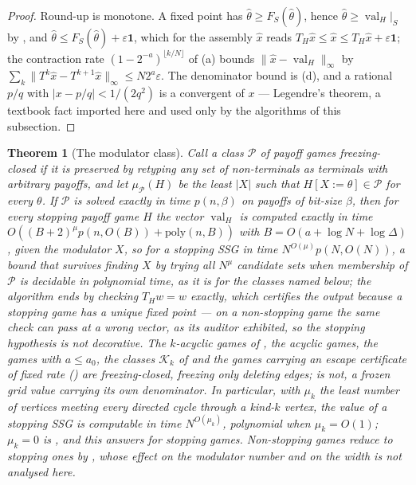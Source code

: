\documentclass[11pt]{article}
\theoremstyle{plain}
\newtheorem{theorem}{Theorem}[section]
\theoremstyle{definition}
\DeclareMathOperator{\val}{val}
\newcommand{\bbone}{\mathbf{1}}
\begin{document}
\begin{proof}
Round-up is monotone. A fixed point has $\hat\theta\ge F_S(\hat\theta)$,
hence $\hat\theta\ge\val_H|_S$ by , and
$\hat\theta\le F_S(\hat\theta)+\varepsilon\bbone$, which for the assembly
$\hat x$ reads $T_H\hat x\le\hat x\le T_H\hat x+\varepsilon\bbone$; the
contraction rate $(1-2^{-a})^{\lfloor k/N\rfloor}$ of
(a) bounds $\|\hat x-\val_H\|_\infty$ by
$\sum_k\|T^{k}\hat x-T^{k+1}\hat x\|_\infty\le N2^{a}\varepsilon$. The
denominator bound is (d), and a rational $p/q$
with $|x-p/q|<1/(2q^{2})$ is a convergent of $x$ --- Legendre's theorem,
a textbook fact imported here and used only by the algorithms of this
subsection.
\end{proof}

\begin{theorem}[The modulator class]\label{thm:modulator}
Call a class $\mathcal P$ of payoff games \emph{freezing-closed} if it is
preserved by retyping any set of non-terminals as terminals with arbitrary
payoffs, and let $\mu_{\mathcal P}(H)$ be the least $|X|$ such that
$H[X{:=}\theta]\in\mathcal P$ for every $\theta$. If $\mathcal P$ is
solved exactly in time $p(n,\beta)$ on payoffs of bit-size $\beta$, then
for every \emph{stopping} payoff game $H$ the vector
$\val_H$ is computed exactly in time
$O((B+2)^{\mu}p(n,O(B))+\mathrm{poly}(n,B))$ with
$B=O(a+\log N+\log\Delta)$, given the modulator $X$, so for a stopping
SSG in time $N^{O(\mu)}p(N,O(N))$, a bound that survives finding $X$ by
trying all $N^{\mu}$ candidate sets when membership of $\mathcal P$ is
decidable in polynomial time, as it is for the classes named below; the algorithm ends by checking $T_Hw=w$ exactly,
which certifies the output because a \emph{stopping} game has a unique
fixed point --- on a non-stopping game the same check can pass at a
wrong vector, as its auditor exhibited, so the stopping hypothesis is not
decorative.
The $k$-acyclic games of , the acyclic games, the games
with $a\le a_0$, the classes $\mathcal K_k$ of 
and the games carrying an escape certificate of fixed rate
() are freezing-closed, freezing only deleting
edges;  is not, a frozen grid value carrying its
own denominator. In particular, with $\mu_k$ the least number of vertices
meeting every directed cycle through a kind-$k$ vertex, the value of a
stopping SSG is computable in time $N^{O(\mu_k)}$, polynomial when
$\mu_k=O(1)$; $\mu_k=0$ is , and this answers
 for stopping games. Non-stopping games reduce to
stopping ones by , whose effect on the
modulator number and on the width is not analysed here.
\end{theorem}
\end{document}
